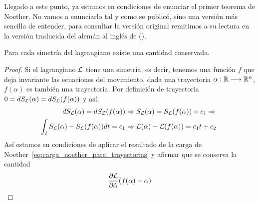 Llegado a este punto, ya estamos en condiciones de enunciar el primer teorema de Noether.
No vamos a enunciarlo tal y como se publicó, sino una versión más sencilla de entender, para consultar la versión original remitimos a su lectura en la versión traducida del alemán al inglés de (\cite{Noether_1971}).

\begin{theorem}
	\label{thm:noether}
	Para cada simetría del lagrangiano existe una cantidad conservada.
\end{theorem}
\begin{proof}
	Si el lagrangiano $\mathcal{L}$ tiene una simetría, es decir, tenemos una función $f$ que deja invariante las ecuaciones del movimiento, dada una trayectoria $\alpha:\mathbb{R}\longrightarrow \mathbb{R}^n$, $f(\alpha)$ es también una trayectoria.
	Por definición de trayectoria $0=dS_{\mathcal{L}}(\alpha)=dS_{\mathcal{L}}(f(\alpha))$ y así:
	\begin{equation}
		\begin{split}
			\label{eq:teorema-noether}
			dS_{\mathcal{L}}(\alpha) = dS_{\mathcal{L}}(f(\alpha)) &\Rightarrow S_{\mathcal{L}}(\alpha)=S_{\mathcal{L}}(f(\alpha))+c_1\Rightarrow\\
			\int_I S_{\mathcal{L}}(\alpha)-S_{\mathcal{L}}(f(\alpha)) dt= c_1 &\Rightarrow \mathcal{L}(\alpha)-\mathcal{L}(f(\alpha))=c_1 t + c_2\
		\end{split}
	\end{equation}
	Así estamos en condiciones de aplicar el resultado de la carga de Noether~\eqref{eq:carga_noether_para_trayectorias} y afirmar que se conserva la cantidad
	\begin{equation*}
		\frac{\partial \mathcal{L}}{\partial\dot{\alpha}}(f(\alpha)-\alpha)
	\end{equation*}
\end{proof}
